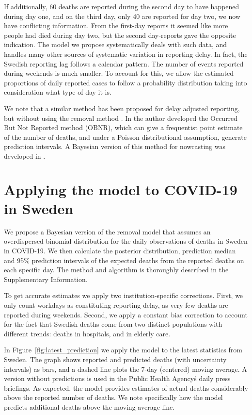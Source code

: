 \documentclass[a4paper,11pth]{article}
\begin{document}
If additionally, 60 deaths are reported during the second day to have happened during day one, and on the third day, only 40 are reported for day two, we now have conflicting information. From the first-day reports it seemed like more people had died during day two, but the second day-reports gave the opposite indication. The model we propose systematically deals with such data, and handles many other sources of systematic variation in reporting delay. In fact, the Swedish reporting lag follows a calendar pattern. The number of events reported during weekends is much smaller. To account for this, we allow the estimated proportions of daily reported cases to follow a probability distribution taking into consideration what type of day it is.

We note that a similar method has been proposed for delay adjusted reporting, but without using the removal method \citep{lawless1994adjustments}. In \cite{lawless1994adjustments} the author developed the Occurred But Not Reported method (OBNR), which can give a frequentist point estimate of the number of deaths, and under a Poisson distributional assumption, generate prediction intervals. A Bayesian version of this method for nowcasting was developed in \cite{hohle2014bayesian}.

\section{Applying the model to COVID-19 in Sweden}
We propose a Bayesian version of the removal model that assumes an overdispersed binomial distribution for the daily observations of deaths in Sweden in COVID-19. We then calculate the posterior distribution, prediction median and 95\% prediction intervals of the expected deaths from the reported deaths on each specific day. The method and algorithm is thoroughly described in the Supplementary Information.

To get accurate estimates we apply two institution-specific corrections. First, we only count workdays as constituting reporting delay, as very few deaths are reported during weekends. Second, we apply a constant bias correction to account for the fact that Swedish deaths come from two distinct populations with different trends: deaths in hospitals, and in elderly care.

In Figure~\ref{fig:latest_prediction} we apply the model to the latest statistics from Sweden. The graph shows reported and predicted deaths (with uncertainty intervals) as bars, and a dashed line plots the 7-day (centered) moving average. A version without predictions is used in the Public Health Agency\'s daily press briefings. As expected, the model provides estimates of actual deaths considerably above the reported number of deaths. We note specifically how the model predicts additional deaths above the moving average line.
\end{document}
